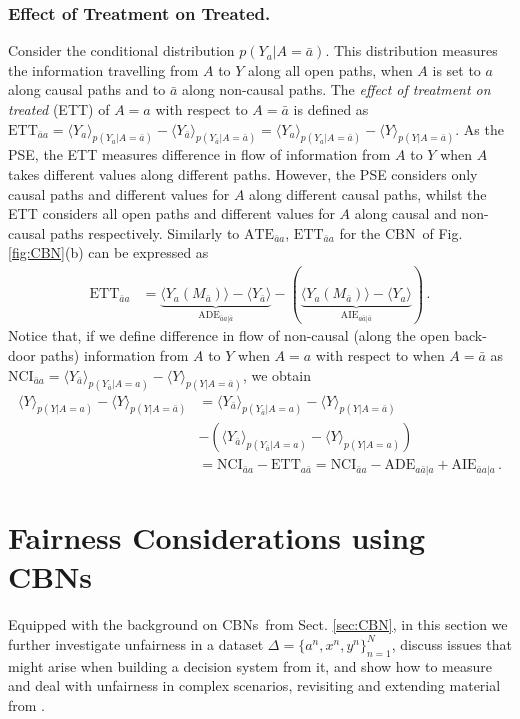 \documentclass[runningheads]{llncs}
\newcommand{\figref}[1]{Fig. \ref{#1}}
\newcommand{\secref}[1]{Sect. \ref{#1}}
\newcommand{\av}[1]{\langle #1 \rangle}
\newcommand{\CBN}{CBN}
\newcommand{\CBNs}{CBNs}
\begin{document}
\subsubsection*{Effect of Treatment on Treated.}
Consider the conditional distribution $p(Y_{a}|A=\bar a)$. This distribution measures the information travelling from $A$ to $Y$ along all open paths, when $A$ is set to $a$ along causal paths and to $\bar a$ along non-causal paths. The \emph{effect of treatment on treated} (ETT) of $A=a$ with respect to $A=\bar a$ is defined as $\textrm{ETT}_{\bar a a} = \av{Y_{a}}_{p(Y_{a}|A=\bar a)}- \av{Y_{\bar a}}_{p(Y_{\bar a}|A=\bar a)} = \av{Y_{a}}_{p(Y_{a}|A=\bar a)} - \av{Y}_{p(Y|A=\bar a)}$. 
As the PSE, the ETT measures difference in flow of information from $A$ to $Y$ when $A$ takes different values along different paths. However, the PSE considers only causal paths and different values for $A$ along different causal paths, whilst the ETT considers all open paths and different values for $A$ along causal and non-causal paths respectively. 
Similarly to $\textrm{ATE}_{\bar a a}$, $\textrm{ETT}_{\bar a a}$ for the \CBN~of \figref{fig:CBN}(b) can be expressed as
\begin{align*}
\textrm{ETT}_{\bar a a} 
&=\underbrace{\av{Y_{a}(M_{\bar a})} - \av{Y_{\bar a}}}_{\textrm{ADE}_{\bar a a|\bar a}}
-(\underbrace{\av{Y_{a}(M_{\bar a})} - \av{Y_{a}}}_{\textrm{AIE}_{a \bar a|\bar a}})\,.
\end{align*}
Notice that, if we define difference in flow of non-causal (along the open back-door paths) information from $A$ to $Y$ when $A=a$ with respect to when $A=\bar a$ as $\textrm{NCI}_{\bar a a} = \av{Y_{\bar a}}_{p(Y_{\bar a}|A=a)} - \av{Y}_{p(Y|A=\bar a)}$, we obtain 
\begin{align*}
\av{Y}_{p(Y|A=a)} - \av{Y}_{p(Y|A=\bar a)} &= \av{Y_{\bar a}}_{p(Y_{\bar a}|A=a)} - \av{Y}_{p(Y|A=\bar a)}\\
& - (\av{Y_{\bar a}}_{p(Y_{\bar a}|A=a)} - \av{Y}_{p(Y|A=a)})\\
&= \textrm{NCI}_{\bar a a} - \textrm{ETT}_{a \bar a} = \textrm{NCI}_{\bar a a} - \textrm{ADE}_{a \bar a| a} + \textrm{AIE}_{\bar a a|a}\,.
\end{align*}

\section{Fairness Considerations using \CBNs}
Equipped with the background on \CBNs~from \secref{sec:CBN}, in this section we further investigate unfairness in a dataset $\Delta=\{a^n, x^n, y^n\}_{n=1}^N$, discuss issues that might arise when building a decision system from it, and show how to measure and deal with unfairness in complex scenarios, revisiting and extending material from \cite{chiappa19path,kusner17counterfactual,zhang18fairness}.
\end{document}
